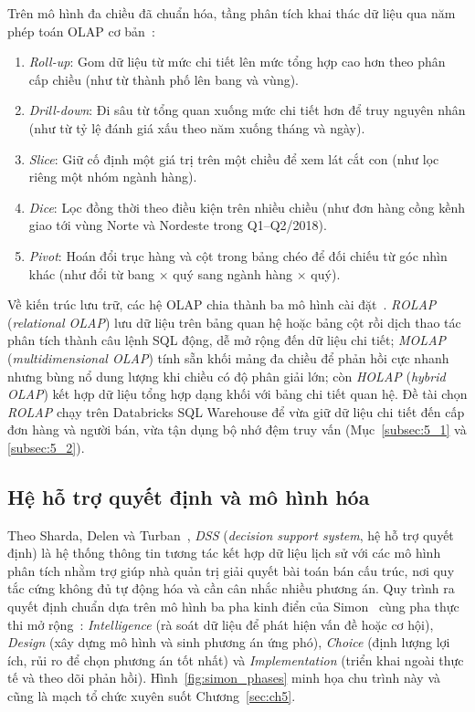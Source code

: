 \documentclass[a4paper]{article}
\begin{document}
Trên mô hình đa chiều đã chuẩn hóa, tầng phân tích khai thác dữ liệu qua năm phép toán OLAP cơ bản~\cite{bib:kimball2013,bib:turban_dss}:
\begin{enumerate}
  \item \textit{Roll-up}: Gom dữ liệu từ mức chi tiết lên mức tổng hợp cao hơn theo phân cấp chiều (như từ thành phố lên bang và vùng).
  \item \textit{Drill-down}: Đi sâu từ tổng quan xuống mức chi tiết hơn để truy nguyên nhân (như từ tỷ lệ đánh giá xấu theo năm xuống tháng và ngày).
  \item \textit{Slice}: Giữ cố định một giá trị trên một chiều để xem lát cắt con (như lọc riêng một nhóm ngành hàng).
  \item \textit{Dice}: Lọc đồng thời theo điều kiện trên nhiều chiều (như đơn hàng cồng kềnh giao tới vùng Norte và Nordeste trong Q1--Q2/2018).
  \item \textit{Pivot}: Hoán đổi trục hàng và cột trong bảng chéo để đối chiếu từ góc nhìn khác (như đổi từ bang $\times$ quý sang ngành hàng $\times$ quý).
\end{enumerate}

Về kiến trúc lưu trữ, các hệ OLAP chia thành ba mô hình cài đặt~\cite{bib:turban_dss}. \textit{ROLAP} (\textit{relational OLAP}) lưu dữ liệu trên bảng quan hệ hoặc bảng cột rồi dịch thao tác phân tích thành câu lệnh SQL động, dễ mở rộng đến dữ liệu chi tiết; \textit{MOLAP} (\textit{multidimensional OLAP}) tính sẵn khối mảng đa chiều để phản hồi cực nhanh nhưng bùng nổ dung lượng khi chiều có độ phân giải lớn; còn \textit{HOLAP} (\textit{hybrid OLAP}) kết hợp dữ liệu tổng hợp dạng khối với bảng chi tiết quan hệ. Đề tài chọn \textit{ROLAP} chạy trên Databricks SQL Warehouse để vừa giữ dữ liệu chi tiết đến cấp đơn hàng và người bán, vừa tận dụng bộ nhớ đệm truy vấn (Mục~\ref{subsec:5_1} và \ref{subsec:5_2}).

\subsection{Hệ hỗ trợ quyết định và mô hình hóa}
\label{subsec:2_4}

Theo Sharda, Delen và Turban~\cite{bib:turban_dss}, \textit{DSS} (\textit{decision support system}, hệ hỗ trợ quyết định) là hệ thống thông tin tương tác kết hợp dữ liệu lịch sử với các mô hình phân tích nhằm trợ giúp nhà quản trị giải quyết bài toán bán cấu trúc, nơi quy tắc cứng không đủ tự động hóa và cần cân nhắc nhiều phương án. Quy trình ra quyết định chuẩn dựa trên mô hình ba pha kinh điển của Simon~\cite{bib:simon1960} cùng pha thực thi mở rộng~\cite{bib:turban_dss}: \textit{Intelligence} (rà soát dữ liệu để phát hiện vấn đề hoặc cơ hội), \textit{Design} (xây dựng mô hình và sinh phương án ứng phó), \textit{Choice} (định lượng lợi ích, rủi ro để chọn phương án tốt nhất) và \textit{Implementation} (triển khai ngoài thực tế và theo dõi phản hồi). Hình~\ref{fig:simon_phases} minh họa chu trình này và cũng là mạch tổ chức xuyên suốt Chương~\ref{sec:ch5}.
\end{document}
